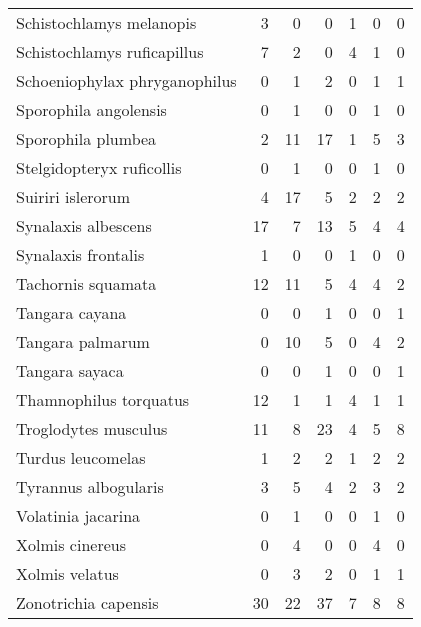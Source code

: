 \begin{table}
\begin{tabular}{lrrrrrr}
    Schistochlamys melanopis & 3 & 0 & 0 & 1 & 0 & 0 \\ 
    Schistochlamys ruficapillus & 7 & 2 & 0 & 4 & 1 & 0 \\ 
    Schoeniophylax phryganophilus & 0 & 1 & 2 & 0 & 1 & 1 \\ 
    Sporophila angolensis & 0 & 1 & 0 & 0 & 1 & 0 \\ 
    Sporophila plumbea & 2 & 11 & 17 & 1 & 5 & 3 \\ 
    Stelgidopteryx ruficollis & 0 & 1 & 0 & 0 & 1 & 0 \\ 
    Suiriri islerorum & 4 & 17 & 5 & 2 & 2 & 2 \\ 
    Synalaxis albescens & 17 & 7 & 13 & 5 & 4 & 4 \\ 
    Synalaxis frontalis & 1 & 0 & 0 & 1 & 0 & 0 \\ 
    Tachornis squamata & 12 & 11 & 5 & 4 & 4 & 2 \\ 
    Tangara cayana & 0 & 0 & 1 & 0 & 0 & 1 \\ 
    Tangara palmarum & 0 & 10 & 5 & 0 & 4 & 2 \\ 
    Tangara sayaca & 0 & 0 & 1 & 0 & 0 & 1 \\ 
    Thamnophilus torquatus & 12 & 1 & 1 & 4 & 1 & 1 \\ 
    Troglodytes musculus & 11 & 8 & 23 & 4 & 5 & 8 \\ 
    Turdus leucomelas & 1 & 2 & 2 & 1 & 2 & 2 \\ 
    Tyrannus albogularis & 3 & 5 & 4 & 2 & 3 & 2 \\ 
    Volatinia jacarina & 0 & 1 & 0 & 0 & 1 & 0 \\ 
    Xolmis cinereus & 0 & 4 & 0 & 0 & 4 & 0 \\ 
    Xolmis velatus & 0 & 3 & 2 & 0 & 1 & 1 \\ 
    Zonotrichia capensis & 30 & 22 & 37 & 7 & 8 & 8 \\ 
  \end{tabular}
\end{table}
